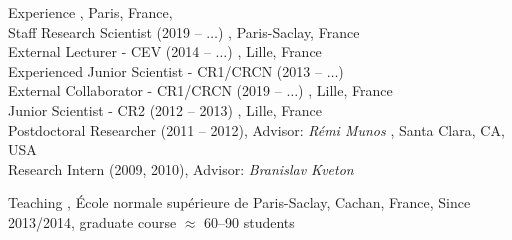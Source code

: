 \documentclass{resume}
\begin{document}
\maketitle




\begin{category}{Experience}
, Paris, France, \\
Staff Research Scientist (2019 -- $\dots$) 
, Paris-Saclay, France \\
External Lecturer - CEV (2014 -- $\dots$)
, Lille, France \\
Experienced Junior Scientist - CR1/CRCN (2013 -- $\dots$) \\
External Collaborator - CR1/CRCN (2019 -- $\dots$) 
, Lille, France \\
Junior Scientist - CR2 (2012 -- 2013)
, Lille, France \\
Postdoctoral Researcher (2011 -- 2012), Advisor:  \emph{R\'emi Munos}
,  Santa Clara, CA, USA\\
Research Intern (2009, 2010), Advisor:  \emph{Branislav Kveton}
\begin{category}{Teaching}
,  %
\' Ecole normale sup\' erieure de Paris-Saclay, Cachan, France, 
Since 2013/2014,  graduate course $\approx$ 60--90 students
\end{category}
\end{category}
\end{document}
